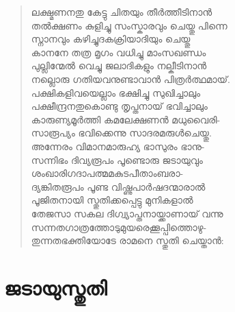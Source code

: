 \begin{verse}
ലക്ഷ്മണനതു കേട്ടു ചിതയും തീര്‍ത്തീടിനാന്‍\\
തല്‍ക്ഷണം കുളിച്ചു സംസ്കാരവും ചെയ്തു പിന്നെ\\
സ്നാനവും കഴിച്ചുദകക്രിയാദിയും ചെയ്തു\\
കാനനേ തത്ര മൃഗം വധിച്ചു മാംസഖണ്ഡം\\
പുല്ലിന്മേല്‍ വെച്ചു ജലാദികളും നല്കീടിനാന്‍\\
നല്ലൊരു ഗതിയവനുണ്ടാവാന്‍ പിത്രര്‍ത്ഥമായ്.\\
പക്ഷികളിവയെല്ലാം ഭക്ഷിച്ചു സുഖിച്ചാലും\\
പക്ഷീന്ദ്രനതുകൊണ്ടു തൃപ്തനായ് ഭവിച്ചാലും\\
കാരുണ്യമൂര്‍ത്തി കമലേക്ഷണന്‍ മധുവൈരി-\\
സാരൂപ്യം ഭവിക്കെന്നു സാദരമരുള്‍ചെയ്തു.\\
അന്നേരം വിമാനമാരുഹ്യ ഭാസുരം ഭാനു-\\
സന്നിഭം ദിവ്യരൂപം പൂണ്ടൊരു ജടായുവും\\
ശംഖാരിഗദാപത്മമകുടപീതാംബരാ-\\
ദ്യങ്കിതരൂപം പൂണ്ട വിഷ്ണുപാര്‍ഷദന്മാരാല്‍\\
പൂജിതനായി സ്തുതിക്കപ്പെട്ടു മുനികളാല്‍\\
തേജസാ സകല ദിഗ്വ്യാപ്തനായ്ക്കാണായ് വന്നു\\
സന്നതഗാത്രത്തോടുമുയരെക്കൂപ്പിത്തൊഴു-\\
തുന്നതഭക്തിയോടേ രാമനെ സ്തുതി ചെയ്താന്‍:
\end{verse}

\section{ജടായുസ്തുതി}

